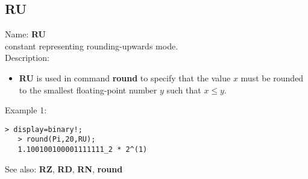 \subsection{ RU }
\noindent Name: \textbf{RU}\\
constant representing rounding-upwards mode.\\

\noindent Description: \begin{itemize}

\item \textbf{RU} is used in command \textbf{round} to specify that the value $x$ must be rounded
   to the smallest floating-point number $y$ such that $x \le y$.
\end{itemize}
\noindent Example 1: 
\begin{center}\begin{minipage}{14.8cm}\begin{Verbatim}[frame=single]
   > display=binary!;
   > round(Pi,20,RU);
   1.100100100001111111_2 * 2^(1)
\end{Verbatim}
\end{minipage}\end{center}
See also: \textbf{RZ}, \textbf{RD}, \textbf{RN}, \textbf{round}
